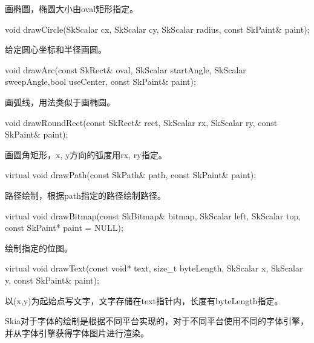 \begin{enumerate}
	画椭圆，椭圆大小由oval矩形指定。

	void drawCircle(SkScalar cx, SkScalar cy, SkScalar radius, const SkPaint\& paint);

	给定圆心坐标和半径画圆。

	void drawArc(const SkRect\& oval, SkScalar startAngle, SkScalar sweepAngle,bool useCenter, const SkPaint\& paint);

	画弧线，用法类似于画椭圆。

	void drawRoundRect(const SkRect\& rect, SkScalar rx, SkScalar ry, const SkPaint\& paint);

	画圆角矩形，x, y方向的弧度用rx, ry指定。

	virtual void drawPath(const SkPath\& path, const SkPaint\& paint);

	路径绘制，根据path指定的路径绘制路径。

	virtual void drawBitmap(const SkBitmap\& bitmap, SkScalar left, SkScalar top, const SkPaint* paint = NULL);

	绘制指定的位图。

	virtual void drawText(const void* text, size\_t byteLength, SkScalar x, SkScalar y, const SkPaint\& paint);

	以(x,y)为起始点写文字，文字存储在text指针内，长度有byteLength指定。

	Skia对于字体的绘制是根据不同平台实现的，对于不同平台使用不同的字体引擎，并从字体引擎获得字体图片进行渲染。

\end{enumerate}



